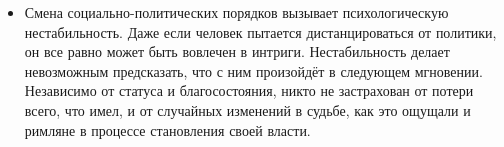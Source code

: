 \begin{itemize}
\item Смена социально-политических порядков вызывает психологическую нестабильность. Даже если человек пытается дистанцироваться от политики, он все равно может быть вовлечен в интриги. Нестабильность делает невозможным предсказать, что с ним произойдёт в следующем мгновении. Независимо от статуса и благосостояния, никто не застрахован от потери всего, что имел, и от случайных изменений в судьбе, как это ощущали и римляне в процессе становления своей власти.


\end{itemize}
